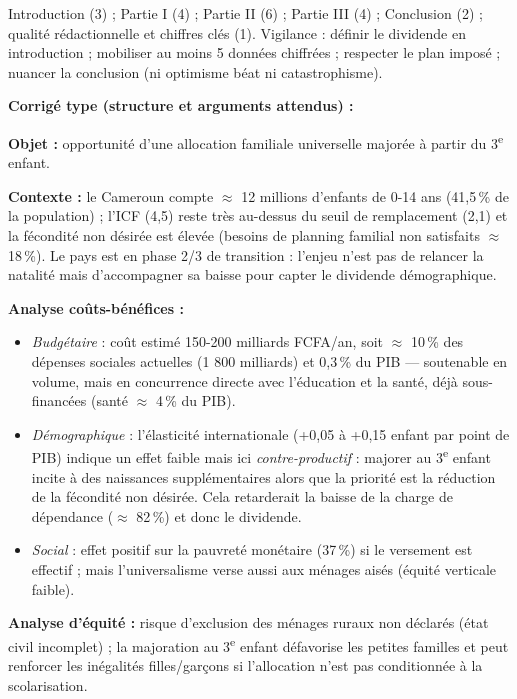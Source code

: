 \documentclass[11pt]{article}
\begin{document}
\begin{attention}
Introduction (3) ; Partie I (4) ; Partie II (6) ; Partie III (4) ; Conclusion (2) ; qualité rédactionnelle et chiffres clés (1). Vigilance : définir le dividende en introduction ; mobiliser au moins 5 données chiffrées ; respecter le plan imposé ; nuancer la conclusion (ni optimisme béat ni catastrophisme).
\end{attention}

\begin{corrige}
\textbf{Corrigé type (structure et arguments attendus) :}

\textbf{Objet :} opportunité d'une allocation familiale universelle majorée à partir du 3\textsuperscript{e} enfant.

\textbf{Contexte :} le Cameroun compte $\approx$ 12 millions d'enfants de 0-14 ans (41,5\,\% de la population) ; l'ICF (4,5) reste très au-dessus du seuil de remplacement (2,1) et la fécondité non désirée est élevée (besoins de planning familial non satisfaits $\approx$ 18\,\%). Le pays est en phase 2/3 de transition : l'enjeu n'est pas de relancer la natalité mais d'accompagner sa baisse pour capter le dividende démographique.

\textbf{Analyse coûts-bénéfices :}
\begin{itemize}
    \item \emph{Budgétaire} : coût estimé 150-200 milliards FCFA/an, soit $\approx$ 10\,\% des dépenses sociales actuelles (1 800 milliards) et 0,3\,\% du PIB — soutenable en volume, mais en concurrence directe avec l'éducation et la santé, déjà sous-financées (santé $\approx$ 4\,\% du PIB).
    \item \emph{Démographique} : l'élasticité internationale (+0,05 à +0,15 enfant par point de PIB) indique un effet faible mais ici \emph{contre-productif} : majorer au 3\textsuperscript{e} enfant incite à des naissances supplémentaires alors que la priorité est la réduction de la fécondité non désirée. Cela retarderait la baisse de la charge de dépendance ($\approx$ 82\,\%) et donc le dividende.
    \item \emph{Social} : effet positif sur la pauvreté monétaire (37\,\%) si le versement est effectif ; mais l'universalisme verse aussi aux ménages aisés (équité verticale faible).
\end{itemize}

\textbf{Analyse d'équité :} risque d'exclusion des ménages ruraux non déclarés (état civil incomplet) ; la majoration au 3\textsuperscript{e} enfant défavorise les petites familles et peut renforcer les inégalités filles/garçons si l'allocation n'est pas conditionnée à la scolarisation.


\end{corrige}
\end{document}

